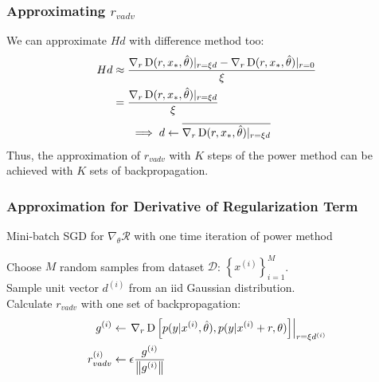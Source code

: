 \begin{frame}
\frametitle{Approximating \(r_{vadv}\)}
We can approximate \(Hd\) with difference method too:
\begin{align*}
Hd &\approx \frac{\nabla_r \operatorname*{D}(r, x_*, \hat{\theta})|_{r=\xi d} - \nabla_r \operatorname*{D}(r, x_*, \hat{\theta})|_{r=0}}{\xi}\\
&= \frac{\nabla_r \operatorname*{D}(r, x_*, \hat{\theta})|_{r=\xi d}}{\xi}
\end{align*}
\pause 
\begin{align*}
\implies d \leftarrow \overline{\nabla_r \operatorname*{D}(r, x_*, \hat{\theta})|_{r=\xi d}}&&
\end{align*}
Thus, the approximation of \(r_{vadv}\) with \(K\) steps of the power method can be achieved with \(K\) sets of backpropagation.
\end{frame}

\begin{frame}
\frametitle{Approximation for Derivative of Regularization Term}
\begin{center}
\begin{minipage}{0.9\linewidth}
\begin{algorithm}[H]
\caption{Mini-batch SGD for \(\nabla_\theta\mathcal{R}\) with one time iteration of power method}
Choose \(M\) random samples from dataset \(\mathcal{D}\): \(\left\{x^{(i)}\right\}_{i=1}^M\).\\
Sample unit vector \(d^{(i)}\) from an iid Gaussian distribution.\\
Calculate \(r_{vadv}\) with one set of backpropagation:
\begin{align*}
g^{(i)} &\gets \left.\nabla_r \operatorname*{D} \left[p(y | x^{(i)}, \hat{\theta}), p(y | x^{(i)} + r, \theta)\right]\right|_{r=\xi d^{(i)}}\\
r_{vadv}^{(i)} &\gets \epsilon \frac{g^{(i)}}{\left\lVert g^{(i)}\right\rVert}
\end{align*}\\
\end{algorithm}
\end{minipage}
\end{center}
\end{frame}

